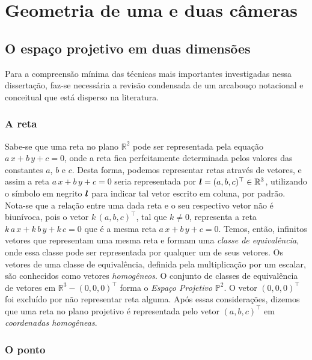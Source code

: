 \newpage
\section{Geometria de uma e duas câmeras}\label{sec.geo-1-2-cam}

\subsection{O espaço projetivo em duas dimensões}\label{sec.espaco-P2}

Para a compreensão mínima das técnicas mais importantes investigadas nessa dissertação, faz-se necessária a revisão condensada de um arcabouço notacional e conceitual que está disperso na literatura.

\subsubsection{A reta}\label{sec.reta}


Sabe-se que uma reta no plano $\mathbb{R}^{2}$ pode ser representada pela equação $a\,x+b\,y+c=0$, onde a reta fica perfeitamente determinada pelos valores das constantes $a$, $b$ e $c$. Desta forma, podemos representar retas através de vetores, e assim a reta $a\,x+b\,y+c=0$ seria representada por $\boldsymbol{l} = (a,b,c)^\top \in \mathbb{R}^{3}$, utilizando o símbolo em negrito $\boldsymbol{l}$ para indicar tal vetor escrito em coluna, por padrão. Nota-se que a relação entre uma dada reta e o seu respectivo vetor não é biunívoca, pois o vetor $k\,(a,b,c)^\top$, tal que $k\neq 0$, representa a reta $k\,a\,x+k\,b\,y+k\,c=0$ que é a mesma reta $a\,x+b\,y+c=0$. Temos, então, infinitos vetores que representam uma mesma reta e formam uma {\it classe de equivalência}, onde essa classe pode ser representada por qualquer um de seus vetores. Os vetores de uma classe de equivalência, definida pela multiplicação por um escalar, são conhecidos como vetores {\it homogêneos}. O conjunto de classes de equivalência de vetores em $\mathbb{R}^{3} - (0,0,0)^\top$ forma o {\it Espaço Projetivo} $\mathbb{P}^{2}$. O vetor $(0,0,0)^\top$ foi excluído por não representar reta alguma. Após essas considerações, dizemos que uma reta no plano projetivo é representada pelo vetor $(a,b,c)^\top$ em {\it coordenadas homogêneas}.\\

\subsubsection{O ponto}\label{sec.ponto}



